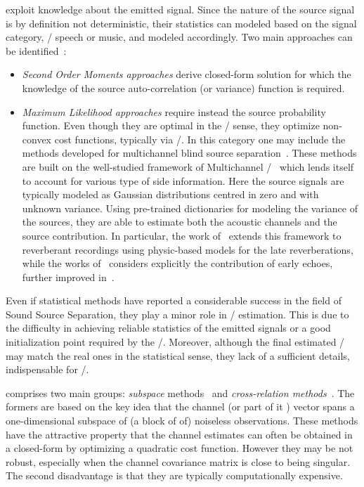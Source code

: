  exploit knowledge about the emitted signal.
Since the nature of the source signal is by definition not deterministic, their statistics can modeled based on the signal category, \eg/ speech or music, and modeled accordingly.
Two main approaches can be identified~:
\begin{itemize}
    \item \textit{Second Order Moments approaches} derive closed-form solution for which the knowledge of the source auto-correlation (or variance) function is required.
    \item \textit{Maximum Likelihood approaches} require instead the source probability function.
    Even though they are optimal in the \ML/ sense, they optimize non-convex cost functions, typically via \EMdef/.
    In this category one may include the methods developed for multichannel blind source separation~.
    These methods are built on the well-studied framework of Multichannel \NMF/~ which lends itself to account for various type of side information.
    Here the source signals are typically modeled as Gaussian distributions centred in zero and with unknown variance.
    Using pre-trained dictionaries for modeling the variance of the sources, they are able to estimate both the acoustic channels and the source contribution.
    In particular, the work of~ extends this framework to reverberant recordings using physic-based models for the late reverberations, while the works of~ considers explicitly the contribution of early echoes, further improved in~.
\end{itemize}
Even if statistical methods have reported a considerable success in the field of Sound Source Separation, they play a minor role in \RIR/ estimation.
This is due to the difficulty in achieving reliable statistics of the emitted signals or a good initialization point required by the \EM/.
Moreover, although the final estimated \RIRs/ may match the real ones in the statistical sense, they lack of a sufficient details, indispensable for \AER/.

 comprises two main groups: \textit{subspace} methods~ and \textit{cross-relation methods}~.
The formers are based on the key idea that the channel (or part of it ) vector spans a one-dimensional subspace of (a block of of) noiseless observations.
These methods have the attractive property that the channel estimates can often be obtained in a closed-form by optimizing a quadratic cost function.
However they may be not robust, especially when the channel covariance matrix is close to being singular.
The second disadvantage is that they are typically computationally expensive.

